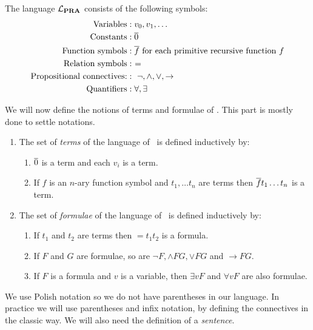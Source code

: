 \documentclass[../main.tex]{subfiles}
\begin{document}
\begin{defi}
	The language $\mathcal{L}_{\text{\textbf{PRA}}}$ consists of the following symbols:
	\begin{align*}
		\text{Variables}&: v_0,v_1,\ldots \\
		\text{Constants} &: \overline{0}\\
		\text{Function symbols} &: \overline f\ \text{for each primitive
		recursive function}\ f\\
			\text{Relation symbols} &:\ =\\
			\text{Propositional connectives:} &:\
			\neg,\wedge,\vee,\rightarrow\\
			\text{Quantifiers} &: \forall,\exists
	\end{align*}
\end{defi}
We will now define the notions of terms and formulae of \PRA. This part is
mostly done to settle notations.

\begin{defi}
	\begin{enumerate}
		\item The set of \textit{terms} of the language of \PRA\ is
			defined inductively by:
			\begin{enumerate}
				\item $\overline 0$ is a term and each $v_i$ is a
					term.
				\item If $f$ is an $n$-ary function symbol and
					$t_1,\ldots t_n$ are terms then $\overline
					f t_1\ldots t_n$ is a term.
			\end{enumerate}
		\item The set of \textit{formulae} of the language of  \PRA\ is
			defined inductively by:
			\begin{enumerate}
				\item If $t_1$ and $t_2$ are terms then 
					$=t_1t_2$ is a formula.
				\item If $F$ and $ G$ are formulae,
					so are
					$\neg F,\wedge F G,\vee F G$
					and $\rightarrow F G$.
				\item If $F$ is a formula and $v$ is a
					variable, then $\exists vF$ and
					$\forall vF$ are also formulae.
			\end{enumerate}
	\end{enumerate}
\end{defi}
We use Polish notation so we do not have parentheses in our language. In
practice we will use parentheses and infix notation, by defining the
connectives in the classic way. We will also need the
definition of a \textit{sentence}.
\end{document}
